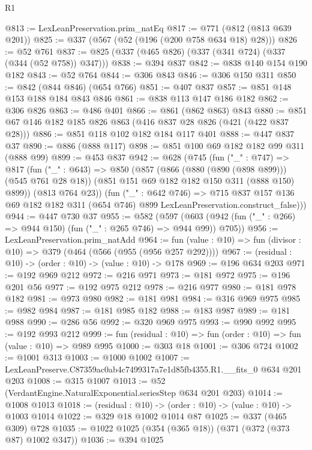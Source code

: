 \begin{lexlean}{R1}
\begin{coremodule}
@813 := LexLeanPreservation.prim_natEq
@817 := @771 (@812 (@813 @639 @201))
@825 := @337 (@567 (@52 (@196 (@200 @758 @634 @18) @28)))
@826 := @52 @761
@837 := @825 (@337 (@465 @826) (@337 (@341 @724) (@337 (@344 (@52 @758)) @347)))
@838 := @394 @837
@842 := @838 @140 @154 @190 @182
@843 := @52 @764
@844 := @306 @843
@846 := @306 @150 @311
@850 := @842 (@844 @846) (@654 @766)
@851 := @407 @837
@857 := @851 @148 @153 @188 @184 @843 @846
@861 := @838 @113 @147 @186 @182
@862 := @306 @826
@863 := @486 @401
@866 := @861 (@862 @863) @843
@880 := @851 @67 @146 @182 @185 @826 @863 (@416 @837 @28 @826 (@421 (@422 @837 @28)))
@886 := @851 @118 @102 @182 @184 @117 @401
@888 := @447 @837 @37
@890 := @886 (@888 @117)
@898 := @851 @100 @69 @182 @182 @99 @311 (@888 @99)
@899 := @453 @837
@942 := @628
    (@745
      (fun ("_" : @747) =>
      @817
        (fun ("_" : @643) =>
        @850
          (@857
            (@866 (@880 (@890 (@898 @899))) (@545 @761 @28 @18))
            (@851 @151 @69 @182 @182 @150 @311 (@888 @150) @899))
          (@813 @764 @23))
        (fun ("_" : @642 @746) =>
        @715
          @837
          @157
          @136
          @69
          @182
          @182
          @311
          (@654 @746)
          @899
          LexLeanPreservation.construct_false)))
@944 := @447 @730 @37
@955 := @582
    (@597 (@603 (@942 (fun ("_" : @266) => @944 @150) (fun ("_" : @265 @746) => @944 @99)) @705))
@956 := LexLeanPreservation.prim_natAdd
@964 := fun (value : @10) => fun (divisor : @10) => @379 (@464 (@566 (@955 (@956 @257 @292))))
@967 := (residual : @10) -> (order : @10) -> (value : @10) -> @178
@969 := @196 @634 @203
@971 := @192 @969 @212
@972 := @216 @971
@973 := @181 @972
@975 := @196 @201 @56
@977 := @192 @975 @212
@978 := @216 @977
@980 := @181 @978 @182
@981 := @973 @980
@982 := @181 @981
@984 := @316 @969 @975
@985 := @982 @984
@987 := @181 @985 @182
@988 := @183 @987
@989 := @181 @988
@990 := @286 @56
@992 := @320 @969 @975
@993 := @990 @992
@995 := @192 @993 @212
@999 := fun (residual : @10) => fun (order : @10) => fun (value : @10) => @989 @995
@1000 := @303 @18
@1001 := @306 @724
@1002 := @1001 @313
@1003 := @1000 @1002
@1007 := LexLeanPreserve.C87359ac0ab4c7499317a7e1d85fb4355.R1.__fits_0 @634 @201 @203
@1008 := @315 @1007
@1013 := @52 (VerdantEngine.NaturalExponential.seriesStep @634 @201 @203)
@1014 := @1008 @1013
@1018 := (residual : @10) -> (order : @10) -> (value : @10) -> @1003 @1014
@1022 := @329 @18 @1002 @1014 @87
@1025 := @337 (@465 @309) @728
@1035 := @1022 @1025 (@354 (@365 @18)) (@371 (@372 (@373 @87) @1002 @347))
@1036 := @394 @1025

\end{coremodule}
\end{lexlean}
